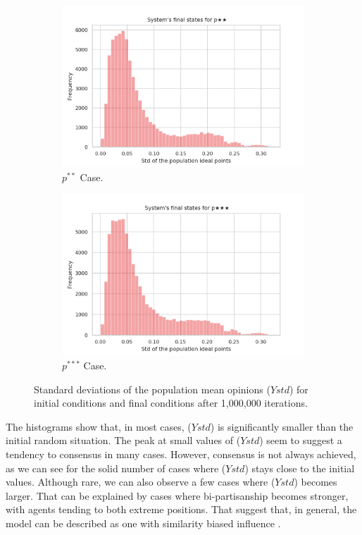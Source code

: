 \documentclass{article}
\begin{document}
\begin{figure}[H]
     \begin{subfigure}[b]{0.49\textwidth}
       \includegraphics[width=\textwidth]{img/Ystd**.png}
  \caption{\(p^{**}\) Case.}
     \end{subfigure}
     \begin{subfigure}[b]{0.49\textwidth}
       \includegraphics[width=\textwidth]{img/Ystd***.png}
       \caption{\(p^{***}\) Case.}
     \end{subfigure}
     \caption{Standard deviations of the population mean opinions (\(Ystd\)) for
       initial conditions and final conditions after 1,000,000 iterations.} 
     \label{fig:std}
    \end{figure}

    The histograms show that, in most cases, (\(Ystd\)) is significantly smaller
    than the initial random situation. The peak at small values of (\(Ystd\))
    seem to suggest a tendency to consensus in many cases. However, consensus is
    not always achieved, as we can see for the solid number of cases where
    (\(Ystd\)) stays close to the initial values. Although rare, we can also
    observe a few cases where (\(Ystd\)) becomes larger. That can be explained
    by cases where bi-partisanship becomes stronger, with agents tending to both
    extreme positions. That suggest that, in general, the model can be described
    as one with similarity biased influence \cite{flache2017}.
   
\end{document}
